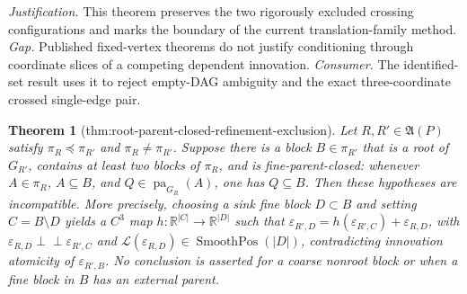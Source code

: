 \documentclass{article}
\newtheorem{theorem}{Theorem}
\begin{document}
\par\smallskip\noindent \textit{Justification.} This theorem preserves the two rigorously excluded crossing configurations and marks the boundary of the current translation-family method. \textit{Gap.} Published fixed-vertex theorems do not justify conditioning through coordinate slices of a competing dependent innovation. \textit{Consumer.} The identified-set result uses it to reject empty-DAG ambiguity and the exact three-coordinate crossed single-edge pair.

\begin{theorem}[thm:root-parent-closed-refinement-exclusion]\label{thm:root-parent-closed-refinement-exclusion}
Let \(R,R'\in\mathfrak A(P)\) satisfy \(\pi_R\preceq\pi_{R'}\) and \(\pi_R\neq\pi_{R'}\). Suppose there is a block \(B\in\pi_{R'}\) that is a root of \(G_{R'}\), contains at least two blocks of \(\pi_R\), and is fine-parent-closed: whenever \(A\in\pi_R\), \(A\subseteq B\), and \(Q\in\operatorname{pa}_{G_R}(A)\), one has \(Q\subseteq B\). Then these hypotheses are incompatible. More precisely, choosing a sink fine block \(D\subset B\) and setting \(C=B\setminus D\) yields a \(C^3\) map \(h:\mathbb R^{|C|}\to\mathbb R^{|D|}\) such that \(\varepsilon_{R',D}=h(\varepsilon_{R',C})+\varepsilon_{R,D}\), with \(\varepsilon_{R,D}\perp\!\!\!\perp\varepsilon_{R',C}\) and \(\mathcal L(\varepsilon_{R,D})\in\operatorname{SmoothPos}(|D|)\), contradicting innovation atomicity of \(\varepsilon_{R',B}\). No conclusion is asserted for a coarse nonroot block or when a fine block in \(B\) has an external parent.
\end{theorem}
\end{document}

